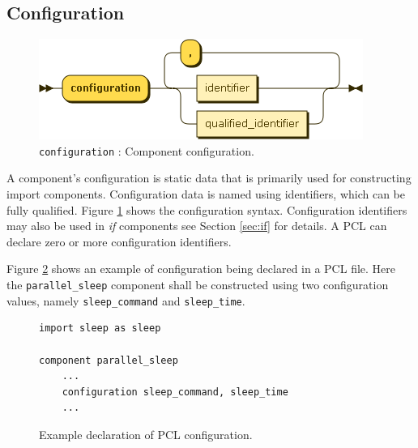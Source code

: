 \subsection{Configuration}\label{subsec:config}
\begin{figure}[h!]
  \centering
    \includegraphics[scale=\DiagramScale]{chapters/compiler/diagrams/configuration}
  \caption{\texttt{configuration} : Component configuration.}
  \label{fig:pcl-config}
\end{figure}
A component's configuration is static data that is primarily used for constructing import components. Configuration data is named using identifiers, which can be fully qualified. Figure \ref{fig:pcl-config} shows the configuration syntax. Configuration identifiers may also be used in \emph{if} components see Section \ref{sec:if} for details. A PCL can declare zero or more configuration identifiers.

Figure \ref{fig:pcl-config-example} shows an example of configuration being declared in a PCL file. Here the \texttt{parallel\_sleep} component shall be constructed using two configuration values, namely \texttt{sleep\_command} and \texttt{sleep\_time}.
\begin{figure}[h!]
\begin{center}
\begin{verbatim}
import sleep as sleep

component parallel_sleep
    ...
    configuration sleep_command, sleep_time
    ...
\end{verbatim}
\end{center}
\caption{Example declaration of PCL configuration.}
\label{fig:pcl-config-example}
\end{figure}

